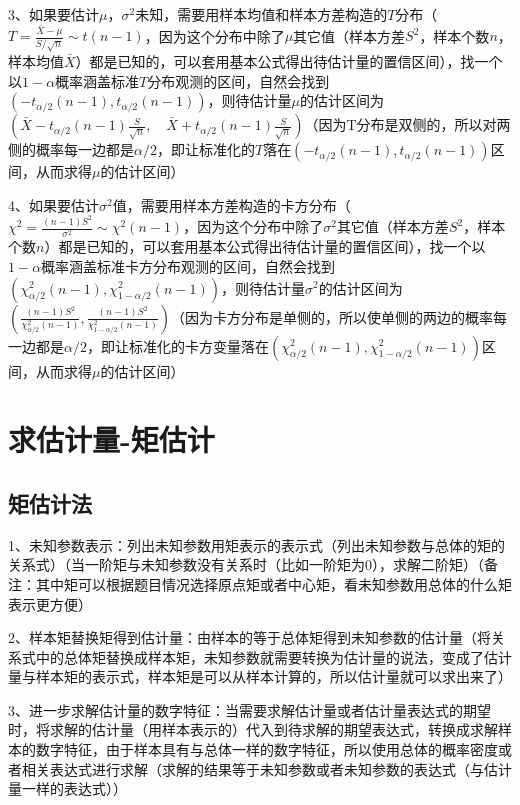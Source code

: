 3、如果要估计$\mu$，$\sigma^{2}$未知，需要用样本均值和样本方差构造的$T$分布（$T=\frac{\bar{X}-\mu}{S / \sqrt{n}} \sim t(n-1)$，因为这个分布中除了$\mu$其它值（样本方差$S^2$，样本个数$n$，样本均值$\bar{X}$）都是已知的，可以套用基本公式得出待估计量的置信区间），找一个以$1−α$概率涵盖标准$T$分布观测的区间，自然会找到$(−t_{\alpha/2}(n-1),t_{\alpha/2}(n-1))$，则待估计量$\mu$的估计区间为$\left(\bar{X}-t_{{\alpha}/{2}}(n-1) \frac{S}{\sqrt{n}}, \quad \bar{X}+t_{{\alpha}/{2}}(n-1) \frac{S}{\sqrt{n}}\right)$（因为T分布是双侧的，所以对两侧的概率每一边都是$\alpha/2$，即让标准化的$T$落在$(−t_{\alpha/2}(n-1),t_{\alpha/2}(n-1))$区间，从而求得$\mu$的估计区间）

4、如果要估计$\sigma^{2}$值，需要用样本方差构造的卡方分布（$\chi^{2}=\frac{(n-1) S^{2}}{\sigma^{2}} \sim \chi^{2}(n-1)$，因为这个分布中除了$\sigma^{2}$其它值（样本方差$S^2$，样本个数$n$）都是已知的，可以套用基本公式得出待估计量的置信区间），找一个以$1−α$概率涵盖标准卡方分布观测的区间，自然会找到$(\chi_{{\alpha}/{2}}^{2}(n-1),\chi_{1-{\alpha}/{2}}^{2}(n-1))$，则待估计量$\sigma^{2}$的估计区间为$\left(\frac{(n-1) S^{2}}{\chi_{{\alpha}/{2}}^{2}(n-1)}, \frac{(n-1) S^{2}}{\chi_{1-{\alpha}/{2}}^{2}(n-1)}\right)$（因为卡方分布是单侧的，所以使单侧的两边的概率每一边都是$\alpha/2$，即让标准化的卡方变量落在$(\chi_{{\alpha}/{2}}^{2}(n-1),\chi_{1-{\alpha}/{2}}^{2}(n-1))$区间，从而求得$\mu$的估计区间）

\section{求估计量-矩估计}



\subsection{矩估计法}

1、未知参数表示：列出未知参数用矩表示的表示式（列出未知参数与总体的矩的关系式）（当一阶矩与未知参数没有关系时（比如一阶矩为0），求解二阶矩）（备注：其中矩可以根据题目情况选择原点矩或者中心矩，看未知参数用总体的什么矩表示更方便）

2、样本矩替换矩得到估计量：由样本的等于总体矩得到未知参数的估计量（将关系式中的总体矩替换成样本矩，未知参数就需要转换为估计量的说法，变成了估计量与样本矩的表示式，样本矩是可以从样本计算的，所以估计量就可以求出来了）

3、进一步求解估计量的数字特征：当需要求解估计量或者估计量表达式的期望时，将求解的估计量（用样本表示的）代入到待求解的期望表达式，转换成求解样本的数字特征，由于样本具有与总体一样的数字特征，所以使用总体的概率密度或者相关表达式进行求解（求解的结果等于未知参数或者未知参数的表达式（与估计量一样的表达式））

